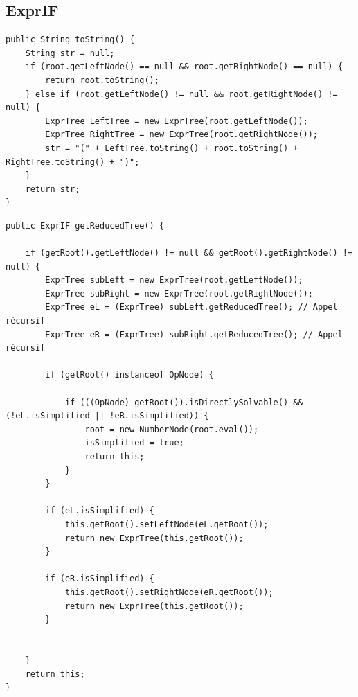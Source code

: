 \documentclass[12pt, a4paper, table]{article}
\begin{document}
\subsection*{ExprIF}
\begin{lstlisting}
public String toString() {
    String str = null;
    if (root.getLeftNode() == null && root.getRightNode() == null) {
        return root.toString();
    } else if (root.getLeftNode() != null && root.getRightNode() != null) {
        ExprTree LeftTree = new ExprTree(root.getLeftNode());
        ExprTree RightTree = new ExprTree(root.getRightNode());
        str = "(" + LeftTree.toString() + root.toString() + RightTree.toString() + ")";
    }
    return str;
}
\end{lstlisting}
\newpage
\begin{lstlisting}
public ExprIF getReducedTree() {

    if (getRoot().getLeftNode() != null && getRoot().getRightNode() != null) {
        ExprTree subLeft = new ExprTree(root.getLeftNode());
        ExprTree subRight = new ExprTree(root.getRightNode());
        ExprTree eL = (ExprTree) subLeft.getReducedTree(); // Appel récursif
        ExprTree eR = (ExprTree) subRight.getReducedTree(); // Appel récursif

        if (getRoot() instanceof OpNode) {

            if (((OpNode) getRoot()).isDirectlySolvable() && (!eL.isSimplified || !eR.isSimplified)) {
                root = new NumberNode(root.eval());
                isSimplified = true;
                return this;
            }
        }

        if (eL.isSimplified) {
            this.getRoot().setLeftNode(eL.getRoot());
            return new ExprTree(this.getRoot());
        }

        if (eR.isSimplified) {
            this.getRoot().setRightNode(eR.getRoot());
            return new ExprTree(this.getRoot());
        }


    }
    return this;
}
\end{lstlisting}
\end{document}
